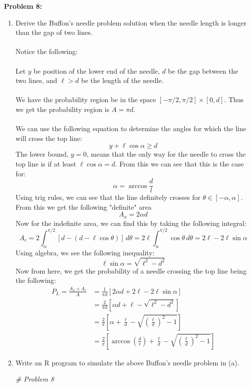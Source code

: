 \documentclass[11pt]{article}
\newenvironment{problem}[1]{\textbf{Problem #1:}}{\newpage}
\newenvironment{Shaded}{\begin{snugshade}}{\end{snugshade}}
\newcommand{\CommentTok}[1]{\textcolor[rgb]{0.56,0.35,0.01}{\textit{#1}}}
\begin{document}
	\begin{problem}{8}
		\begin{enumerate}[label = (\alph*)]
			\item Derive the Buffon's needle problem solution when the needle length is longer than the gap of two lines.
			\\ \\
			Notice the following:
			\\ \\
			Let $y$ be position of the lower end of the needle, $d$ be the gap between the two lines, and $\ell > d$ be the length of the needle.
			\\ \\
			We have the probability region be in the space $[-\pi/2, \pi/2] \times [0,d]$.  Thus we get the probability region is $A = \pi d$.
			\\ \\
			We can use the following equation to determine the angles for which the line will cross the top line:
			\[y + \ell \cos \alpha \geq d\]
			The lower bound, $y = 0$, means that the only way for the needle to cross the top line is if at least $\ell \cos \alpha = d$.  From this we can see that this is the case for:
			\[\alpha = \arccos \frac{d}{l}\]
			Using trig rules, we can see that the line definitely crosses for $\theta \in [-\alpha, \alpha]$.  From this we get the following "definite" area 
			\[A_x = 2\alpha d\]
			Now for the indefinite area, we can find this by taking the following integral:
			\[A_c = 2\int_{\alpha}^{\pi/2} \left[d - (d - \ell \cos \theta)\right]\,d\theta = 2\ell \int_{\alpha}^{\pi/2} \cos \theta \,d\theta = 2\ell - 2\ell \sin \alpha\] 
			Using algebra, we see the following inequality:
			\[\ell \sin \alpha = \sqrt{\ell^2 - d^2}\]
			Now from here, we get the probability of a needle crossing the top line being the following:
			\begin{align*}
				P_L = \frac{A_x + A_c}{A} &= \frac{1}{\pi d}\left[2\alpha d + 2\ell - 2\ell \sin \alpha \right] \\
				&= \frac{2}{\pi d}\left[\alpha d + \ell - \sqrt{\ell^2 - d^2}\right] \\
				&= \frac{2}{\pi }\left[\alpha + \frac{\ell}{d} - \sqrt{\left(\frac{\ell}{d}\right)^2 - 1}\right] \\
				&= \frac{2}{\pi }\left[\arccos\left(\frac{d}{\ell}\right) + \frac{\ell}{d} - \sqrt{\left(\frac{\ell}{d}\right)^2 - 1}\right]
			\end{align*}
			\newpage
			\item Write an R program to simulate the above Buffon's needle problem in (a). \\
\begin{Shaded}
\begin{Highlighting}[]
\CommentTok{# Problem 8}


\end{Highlighting}
\end{Shaded}
\end{enumerate}
\end{problem}
\end{document}
